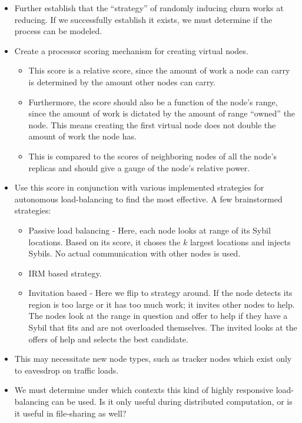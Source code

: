 \begin{itemize}
	\item Further establish that the ``strategy'' of randomly inducing churn works at reducing.
	If we successfully establish it exists,  we must determine if the process can be modeled.%
	
	\item Create a  processor scoring mechanism for creating virtual nodes.
	\begin{itemize}
		\item This score is a relative score, since the amount of work a node can carry is determined by the amount other nodes can carry.
		\item Furthermore, the score should also be a function of the node's range, since the amount of work is dictated by the amount of range ``owned'' the node. 
		This means creating the first virtual node does not double the amount of work the node has.
		\item This is compared to the scores of neighboring nodes  of all the node's replicas and should give a gauge of the node's relative  power.
	\end{itemize}
	\item Use this score in conjunction with various implemented strategies for autonomous load-balancing to find the most effective.
	A few brainstormed strategies:
	\begin{itemize}
		\item Passive load balancing -  Here, each node looks at range of its Sybil locations.
		Based on its score, it choses the $k$ largest locations and injects Sybils.
		No actual communication with other nodes is used.
		\item IRM \cite{irm} based  strategy.
		\item Invitation based -  Here we flip to strategy around.
		If the node detects its region is too large or it has too much work; it invites other nodes to help.
		The nodes look at the range in question and offer to help if they have a Sybil that fits and are not overloaded themselves.
		The invited looks at the offers of help and selects the best candidate.
	\end{itemize}
	\item This may necessitate new node types, such as tracker nodes which exist only to eavesdrop on traffic loads.
	\item We must determine under which contexts this kind of highly responsive load-balancing can be used. 
	Is it only useful during distributed computation, or is it useful in file-sharing as well?
	
	
\end{itemize}


